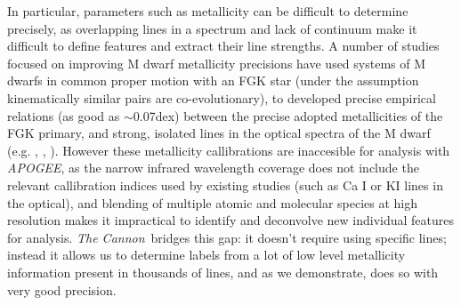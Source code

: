 \documentclass[modern]{aastex62}
\newcommand{\apogee}{\textsl{APOGEE}}
\newcommand{\thecannon}{\textsl{The Cannon}}
\begin{document}
In particular, parameters such as metallicity can be difficult to determine precisely, as overlapping lines in a spectrum and lack of continuum make it difficult to define features and extract their line strengths. A number of studies focused on improving M dwarf metallicity precisions have used systems of M dwarfs in common proper motion with an FGK star (under the assumption kinematically similar pairs are co-evolutionary), to developed precise empirical relations (as good as $\sim$0.07dex) between the precise adopted metallicities of the FGK primary, and strong, isolated lines in the optical spectra of the M dwarf (e.g. \citealt{Terrien:2012}, \citealt{Rojas-Ayala:2012}, \citealt{Newton:2014}).
However these metallicity callibrations are inaccesible for analysis with \apogee, as the narrow infrared wavelength coverage does not include the relevant callibration indices used by existing studies (such as Ca I or KI lines in the optical), and blending of multiple atomic and molecular species at high resolution makes it impractical to identify and deconvolve new individual features for analysis. \thecannon\ bridges this gap: it doesn't require using specific lines; instead it allows us to determine labels from a lot of low level metallicity information present in thousands of lines, and as we demonstrate, does so with very good precision.

\end{document}
